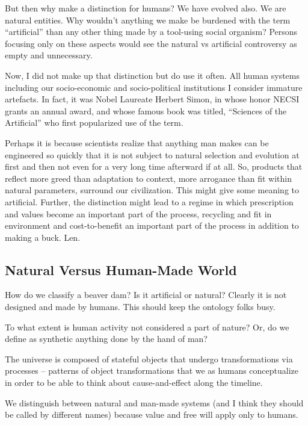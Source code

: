 But then why make a distinction for humans?  We have evolved also. We are natural entities. Why wouldn’t anything we make be burdened with the term “artificial” than any other thing made by a tool-using social organism?  Persons focusing only on these aspects would see the natural vs artificial controversy as empty and unnecessary.

Now, I did not make up that distinction but do use it often. All human systems including our socio-economic and socio-political institutions I consider immature artefacts. In fact, it was Nobel Laureate Herbert Simon, in whose honor NECSI grants an annual award, and whose famous book was titled, “Sciences of the Artificial” who first popularized use of the term.

Perhaps it is because scientists realize that anything man makes can be engineered so quickly that it is not subject to natural selection and evolution at first and then not even for a very long time afterward if at all. So, products that reflect more greed than adaptation to context, more arrogance than fit within natural parameters, surround our civilization. This might give some meaning to artificial. Further, the distinction might lead to a regime in which prescription and values become an important part of the process, recycling and fit in environment and cost-to-benefit an important part of the process in addition to making a buck. Len.

\subsection{Natural Versus Human-Made World}\label{subsec:naturalVsHumanWorld}

How do we classify a beaver dam?  Is it artificial or natural?  Clearly it is not designed and made by humans. This should keep the ontology folks busy.
	
To what extent is human activity not considered a part of nature? Or, do we define as synthetic anything done by the hand of man?

The universe is composed of stateful objects that undergo transformations via processes – patterns of object transformations that we as humans conceptualize in order to be able to think about cause-and-effect along the timeline.

We distinguish between natural and man-made systems (and I think they should be called by different names) because value and free will apply only to humans.

